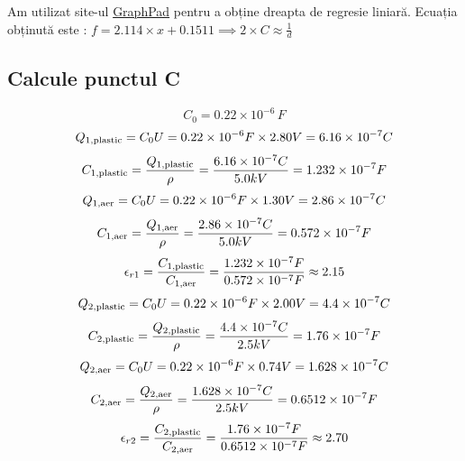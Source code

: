 \documentclass[12pt]{article}
\begin{document}
Am utilizat site-ul \href{https://www.graphpad.com}{GraphPad} pentru a obține dreapta de regresie liniară. Ecuația obținută este : $f = 2.114 \times x + 0.1511 \implies 2 \times C \approx \frac{1}{d}$\\

\subsection{Calcule punctul C}
\begin{equation}
C_{0} = 0.22 \times 10^{-6} \, F
\end{equation}
\begin{equation}
Q_{1,\text{plastic}} = C_{0}U = 0.22 \times 10^{-6}F \times 2.80V = 6.16 \times 10^{-7}C\\
\end{equation}
\begin{equation}
C_{1,\text{plastic}} = \frac{Q_{1,\text{plastic}}}{\rho} = \frac{6.16 \times 10^{-7}C}{5.0kV} = 1.232 \times 10^{-7}F\\
\end{equation}
\begin{equation}
Q_{1,\text{aer}} = C_{0}U = 0.22 \times 10^{-6}F \times 1.30V = 2.86 \times 10^{-7}C\\
\end{equation}
\begin{equation}
C_{1,\text{aer}} = \frac{Q_{1,\text{aer}}}{\rho} = \frac{2.86 \times 10^{-7}C}{5.0kV} = 0.572 \times 10^{-7}F\\
\end{equation}
\begin{equation}
\epsilon_{r1} = \frac{C_{1,\text{plastic}}}{C_{1,\text{aer}}} = \frac{1.232 \times 10^{-7}F}{0.572 \times 10^{-7}F} \approx 2.15\\
\end{equation}
\begin{equation}
Q_{2,\text{plastic}} = C_{0}U = 0.22 \times 10^{-6}F \times 2.00V = 4.4 \times 10^{-7}C\\
\end{equation}
\begin{equation}
C_{2,\text{plastic}} = \frac{Q_{2,\text{plastic}}}{\rho} = \frac{4.4 \times 10^{-7}C}{2.5kV} = 1.76 \times 10^{-7}F\\
\end{equation}
\begin{equation}
Q_{2,\text{aer}} = C_{0}U = 0.22 \times 10^{-6}F \times 0.74V = 1.628 \times 10^{-7}C\\
\end{equation}
\begin{equation}
C_{2,\text{aer}} = \frac{Q_{2,\text{aer}}}{\rho} = \frac{1.628 \times 10^{-7}C}{2.5kV} = 0.6512 \times 10^{-7}F\\
\end{equation}
\begin{equation}
\epsilon_{r2} = \frac{C_{2,\text{plastic}}}{C_{2,\text{aer}}} = \frac{1.76 \times 10^{-7}F}{0.6512 \times 10^{-7}F} \approx 2.70\\
\end{equation}
\end{document}
